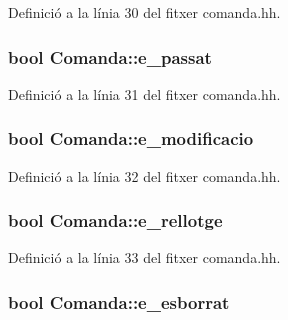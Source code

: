 Definició a la línia 30 del fitxer comanda.\-hh.

\hypertarget{class_comanda_a38e7cdf2003076cbe88461f03dc2106c}{
\subsubsection[{e\-\_\-passat}]{\setlength{\rightskip}{0pt plus 5cm}bool Comanda\-::e\-\_\-passat\hspace{0.3cm}{\ttfamily [private]}}}\label{class_comanda_a38e7cdf2003076cbe88461f03dc2106c}


Definició a la línia 31 del fitxer comanda.\-hh.

\hypertarget{class_comanda_a96d917429f6bfa73608d745ad1e1dfc7}{
\subsubsection[{e\-\_\-modificacio}]{\setlength{\rightskip}{0pt plus 5cm}bool Comanda\-::e\-\_\-modificacio\hspace{0.3cm}{\ttfamily [private]}}}\label{class_comanda_a96d917429f6bfa73608d745ad1e1dfc7}


Definició a la línia 32 del fitxer comanda.\-hh.

\hypertarget{class_comanda_ad73910246f9c47c887a3c01b53350282}{
\subsubsection[{e\-\_\-rellotge}]{\setlength{\rightskip}{0pt plus 5cm}bool Comanda\-::e\-\_\-rellotge\hspace{0.3cm}{\ttfamily [private]}}}\label{class_comanda_ad73910246f9c47c887a3c01b53350282}


Definició a la línia 33 del fitxer comanda.\-hh.

\hypertarget{class_comanda_a70a9790e90a45015dbcd4c6700ec0812}{
\subsubsection[{e\-\_\-esborrat}]{\setlength{\rightskip}{0pt plus 5cm}bool Comanda\-::e\-\_\-esborrat\hspace{0.3cm}{\ttfamily [private]}}}\label{class_comanda_a70a9790e90a45015dbcd4c6700ec0812}


